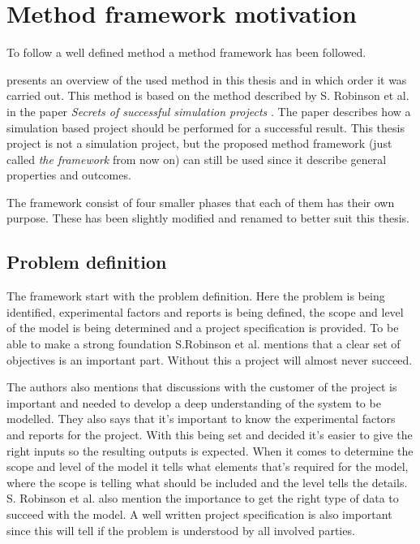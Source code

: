 \section{Method framework motivation}\label{sec:methodFramework}
To follow a well defined method a method framework has been followed.


 presents an overview of the used method in this thesis and in which order it was carried out.
This method is based on the method described by S. Robinson et al. in the paper \textit{Secrets of successful simulation projects} \cite{SecretsSuccessfulSimulation1995}.
The paper describes how a simulation based project should be performed for a successful result.
This thesis project is not a simulation project, but the proposed method framework (just called \textit{the framework} from now on) can still be used since it describe general properties and outcomes.

\bigskip

The framework consist of four smaller phases that each of them has their own purpose.
These has been slightly modified and renamed to better suit this thesis.


\subsection{Problem definition}\label{sec:methodFrameworkProblemDefinition}
The framework start with the problem definition.
Here the problem is being identified, experimental factors and reports is being defined, the scope and level of the model is being determined and a project specification is provided.
To be able to make a strong foundation S.Robinson et al. mentions that a clear set of objectives is an important part. 
Without this a project will almost never succeed.

\bigskip

The authors also mentions that discussions with the customer of the project is important and needed to develop a deep understanding of the system to be modelled.
They also says that it's important to know the experimental factors and reports for the project.
With this being set and decided it's easier to give the right inputs so the resulting outputs is expected.
When it comes to determine the scope and level of the model it tells what elements that's required for the model, where the scope is telling what should be included and the level tells the details.
S. Robinson et al. also mention the importance to get the right type of data to succeed with the model. 
A well written project specification is also important since this will tell if the problem is understood by all involved parties.


